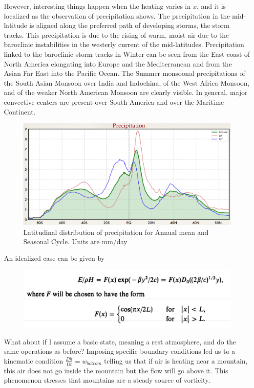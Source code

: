 However, interesting things happen when the heating varies in $x$, and it is localized as the observation of precipitation shows. The precipitation in the mid-latitude is aligned along the preferred path of developing storms, the storm tracks. This precipitation is due to the rising of warm, moist air due to the baroclinic instabilities in the westerly current of the mid-latitudes. Precipitation linked to the baroclinic storm tracks in Winter can be seen from the East coast of North America elongating into Europe and the Mediterranean and from the Asian Far East into the Pacific Ocean. The Summer monsoonal precipitations of the South Asian Monsoon over India and Indochina, of the West Africa Monsoon, and of the weaker North American Monsoon are clearly visible. In general, major convective centers are present over South America and over the Maritime Continent.
\begin{figure}[htpb]
	\centering
	\includegraphics[width=0.45\linewidth]{upload/precipit.png}
	\caption{Latitudinal distribution of precipitation for Annual
		mean and Seasonal Cycle. Units are mm/day}
	\label{fig:precipitation}
\end{figure}


An idealized case can be given by
\begin{figure}[htpb]
	\centering
	\includegraphics[width=0.5\linewidth]{upload/22image.png}
\end{figure}

What about if I assume a basic state, meaning a rest atmosphere, and do the same operations as before? Imposing specific boundary conditions led us to a kinematic condition $\frac{Dh}{Dt}=w_{bottom}$ telling us that if air is heating near a mountain, this air does not go inside the mountain but the flow will go above it. This phenomenon stresses that mountains are a steady source of vorticity.


